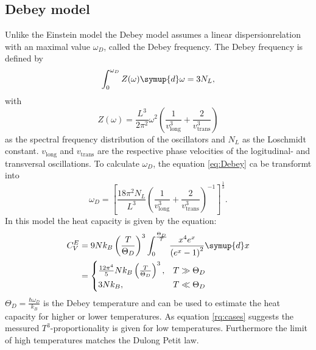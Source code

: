 \subsection{Debey model}
Unlike the Einstein model the Debey model assumes a linear dispersionrelation with an maximal value $\omega_D$, called the Debey frequency.
The Debey frequency is defined by
\begin{equation}
    \label{eq:Debey}
    \int_0^{\omega_D}Z(\omega) \symup{d}\omega = 3 N_L,
\end{equation}
with 
\begin{equation}
    Z(\omega) = \frac{L^3}{2\pi^2}\omega^2\left(\frac{1}{v_\text{long}^3}+\frac{2}{v_\text{trans}^3}\right)
\end{equation} 
as the spectral frequency distribution of the oscillators and $N_L$ as the Loschmidt constant.
$v_\text{long}$ and $v_\text{trans}$ are the respective phase velocities of the logitudinal- and transversal oscillations.
To calculate $\omega_D$, the equation \eqref{eq:Debey} ca be transformt into
\begin{equation}
    \omega_D = \left[\frac{18\pi^2N_L}{L^3}\left(\frac{1}{v_\text{long}^3}+\frac{2}{v_\text{trans}^3}\right)^{-1}\right]^\frac{1}{3}.
\end{equation}
In this model the heat capacity is given by the equation:
\begin{align}
    C_V^E &= 9Nk_B\left(\frac{T}{\Theta_D}\right)^3 \int_0^{\frac{\Theta_D}{T}}\frac{x^4e^x}{\left(e^x-1\right)^2} \symup{d}x \\
    & =
    \begin{cases}
    \frac{12\pi^4}{5}Nk_B\left(\frac{T}{\Theta_D}\right)^3 , & T \gg \Theta_D \\
    3Nk_B , & T \ll \Theta_D
    \end{cases}
    \label{eq:cases}
\end{align}
$\Theta_D=\frac{\hbar \omega_D}{k_B}$ is the Debey temperature and can be used to estimate the heat capacity for higher or lower temperatures.
As equation \eqref{rq:cases} suggests the messured $T^3$-proportionality is given for low temperatures. 
Furthermore the limit of high temperatures matches the Dulong Petit law.








